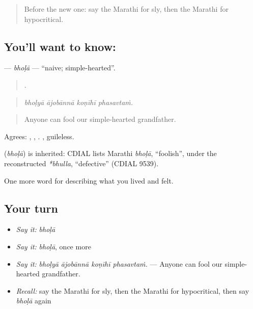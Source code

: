 \label{lesson:MR-C470-bhola}



\begin{quote}
Before the new one: say the Marathi for sly, then the Marathi for hypocritical.
\end{quote}

\subsection*{You'll want to know: }
\textbf{} — \emph{bhoḷā} — \textquotedblleft{}naive; simple-hearted\textquotedblright{}.

\begin{quote}
   .
\end{quote}

\begin{quote}
\emph{bhoḷyā ājobānnā koṇīhī phasavtaṁ.}
\end{quote}

\begin{quote}
Anyone can fool our simple-hearted grandfather.
\end{quote}

Agrees: , , . , guileless.

\begin{cousinweb}
\textbf{} (\emph{bhoḷā}) is inherited: CDIAL lists Marathi \emph{bhoḷā}, \textquotedblleft{}foolish\textquotedblright{}, under the reconstructed \emph{*bhulla}, \textquotedblleft{}defective\textquotedblright{} (CDIAL 9539).
\end{cousinweb}

\begin{grammarlens}[title={What you've built}]
One more word for describing what you lived and felt.
\end{grammarlens}

\subsection*{Your turn}
\begin{itemize}
\raggedright
  \item \emph{Say it:} \emph{bhoḷā}
  \item \emph{Say it:} \emph{bhoḷā}, once more
  \item \emph{Say it:} \emph{bhoḷyā ājobānnā koṇīhī phasavtaṁ.} — Anyone can fool our simple-hearted grandfather.
  \item \emph{Recall:} say the Marathi for sly, then the Marathi for hypocritical, then say \emph{bhoḷā} again
\end{itemize}


